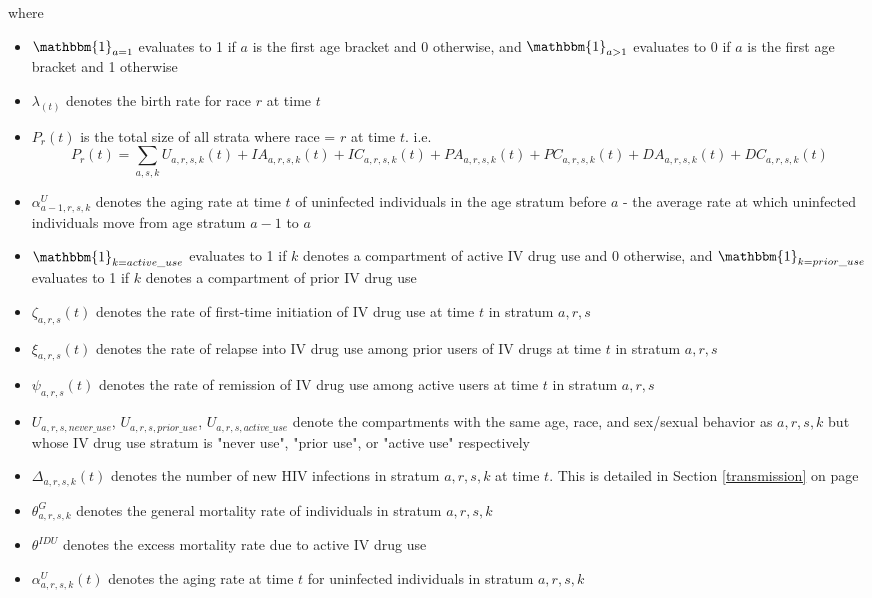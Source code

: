 \documentclass{article}
\begin{document}
where
\begin{itemize}
	\item $\mathbbm{1}_{a=1}$ evaluates to 1 if $a$ is the first age bracket and 0 otherwise, and $\mathbbm{1}_{a>1}$ evaluates to 0 if $a$ is the first age bracket and 1 otherwise
	\item $\lambda_(t)$ denotes the birth rate for race $r$ at time $t$
	\item $P_r(t)$ is the total size of all strata where race = $r$ at time $t$. i.e.
		\begin{equation*}
			P_r(t) = \sum_{a,s,k} U_{a,r,s,k}(t) + IA_{a,r,s,k}(t) + IC_{a,r,s,k}(t) + PA_{a,r,s,k}(t) + PC_{a,r,s,k}(t) + DA_{a,r,s,k}(t) + DC_{a,r,s,k}(t)
		\end{equation*}
	\item $\alpha^U_{a-1,r,s,k}$ denotes the aging rate at time $t$ of uninfected individuals in the age stratum before $a$ - the average rate at which uninfected individuals move from age stratum $a-1$ to $a$
	\item $\mathbbm{1}_{k=active\_use}$ evaluates to 1 if $k$ denotes a compartment of active IV drug use and 0 otherwise, and $\mathbbm{1}_{k=prior\_use}$ evaluates to 1 if $k$ denotes a compartment of prior IV drug use
	\item $\zeta_{a,r,s}(t)$ denotes the rate of first-time initiation of IV drug use at time $t$ in stratum $a,r,s$
	\item $\xi_{a,r,s}(t)$ denotes the rate of relapse into IV drug use among prior users of IV drugs at time $t$ in stratum $a,r,s$
	\item $\psi_{a,r,s}(t)$ denotes the rate of remission of IV drug use among active users at time $t$ in stratum $a,r,s$
	\item $U_{a,r,s,never\_use}$, $U_{a,r,s,prior\_use}$, $U_{a,r,s,active\_use}$ denote the compartments with the same age, race, and sex/sexual behavior as $a,r,s,k$ but whose IV drug use stratum is "never use", "prior use", or "active use" respectively	
	\item $\Delta_{a,r,s,k}(t)$ denotes the number of new HIV infections in stratum $a,r,s,k$ at time $t$. This is detailed in Section \ref{transmission} on page \pageref{transmission}
	\item $\theta^G_{a,r,s,k}$ denotes the general mortality rate of individuals in stratum $a,r,s,k$
	\item  $\theta^{IDU}$ denotes the excess mortality rate due to active IV drug use
	\item $\alpha^U_{a,r,s,k}(t)$ denotes the aging rate at time $t$ for uninfected individuals in stratum $a,r,s,k$

\end{itemize}
\end{document}
